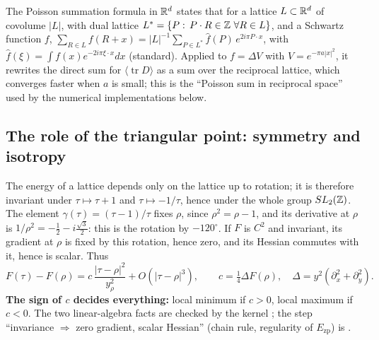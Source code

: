 \begin{uniremark}\tierL{} The Poisson summation formula in $\mathbb{R}^d$ states that for a lattice $L\subset\mathbb{R}^d$ of covolume
$|L|$, with dual lattice $L^*=\{P:\,P\cdot R\in\Z\ \forall R\in L\}$, and a Schwartz function $f$,
$\sum_{R\in L}f(R+x)=|L|^{-1}\sum_{P\in L^*}\hat f(P)\,e^{2i\pi P\cdot x}$, with $\hat f(\xi)=\int f(x)e^{-2i\pi\xi\cdot x}dx$
(standard). Applied to $f=\Delta V$ with $V=e^{-\pi a|x|^2}$, it rewrites the direct sum for
$\langle\operatorname{tr}D\rangle$ as a sum over the reciprocal lattice, which converges faster when $a$ is small; this
is the ``Poisson sum in reciprocal space'' used by the numerical implementations below.
\end{uniremark}

\subsection{The role of the triangular point: symmetry and isotropy}\label{ch3:sec:isotropie}
The energy of a lattice depends only on the lattice up to rotation; it is therefore invariant under $\tau\mapsto\tau+1$
and $\tau\mapsto-1/\tau$, hence under the whole group $SL_2(\mathbb{Z})$. The element $\gamma(\tau)=(\tau-1)/\tau$ fixes $\rho$,
since $\rho^2=\rho-1$, and its derivative at $\rho$ is $1/\rho^2=-\tfrac12-i\tfrac{\sqrt3}2$: this is the rotation by
$-120^\circ$. If $F$ is $C^2$ and invariant, its gradient at $\rho$ is fixed by this rotation, hence zero, and its
Hessian commutes with it, hence is scalar. Thus
\begin{equation}\label{ch3:eq:courbure}
F(\tau)-F(\rho)=c\,\frac{|\tau-\rho|^2}{y_\rho^2}+O(|\tau-\rho|^3),\qquad c=\tfrac14\Delta F(\rho),\quad
\Delta=y^2(\partial_x^2+\partial_y^2).
\end{equation}
\textbf{The sign of $c$ decides everything:} local minimum if $c>0$, local maximum if $c<0$. The two linear-algebra
facts are checked by the kernel \tierAs; the step ``invariance $\Rightarrow$ zero gradient, scalar Hessian''
(chain rule, regularity of $E_{\mathrm{zp}}$) is \tierC.

